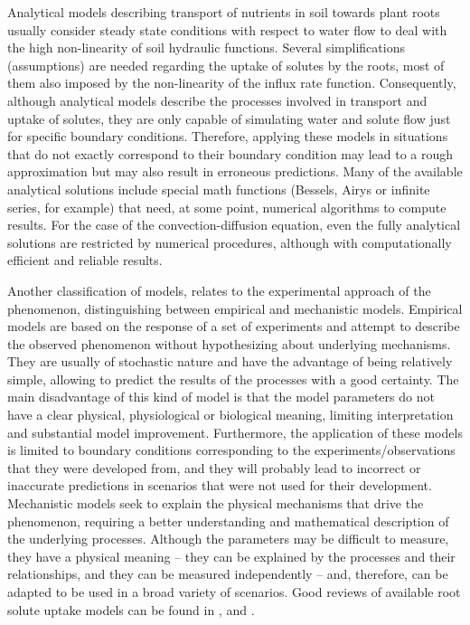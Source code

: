 Analytical models describing transport of nutrients in soil towards plant roots usually consider steady state conditions with respect to water flow to deal with the high non-linearity of soil hydraulic functions. 
Several simplifications (assumptions) are needed regarding the uptake of solutes by the roots, most of them also imposed by the non-linearity of the influx rate function. 
Consequently, although analytical models describe the processes involved in transport and uptake of solutes, they are only capable of simulating water and solute flow just for specific boundary conditions.
Therefore, applying these models in situations that do not exactly correspond to their boundary condition may lead to a rough approximation but may also result in erroneous predictions.
Many of the available analytical solutions include special math functions (Bessels, Airys or infinite series, for example) that need, at some point, numerical algorithms to compute results.
For the case of the convection-diffusion equation, even the fully analytical solutions are restricted by numerical procedures, although with computationally efficient and reliable results.

Another classification of models, relates to the experimental approach of the phenomenon, distinguishing between empirical and mechanistic models. 
Empirical models \citep{chanter,ross,yerokun} are based on the response of a set of experiments and attempt to describe the observed phenomenon without hypothesizing about underlying mechanisms. 
They are usually of stochastic nature and have the advantage of being relatively simple, allowing to predict the results of the processes with a good certainty. 
The main disadvantage of this kind of model is that the model parameters do not have a clear physical, physiological or biological meaning, limiting interpretation and substantial model improvement. 
Furthermore, the application of these models is limited to boundary conditions corresponding to the experiments/observations that they were developed from, and they will probably lead to incorrect or inaccurate predictions in scenarios that were not used for their development.
Mechanistic models \citep{barber74,cushman,willigen1,roose,simunekHYDRUS,somma,vandam} seek to explain the physical mechanisms that drive the phenomenon, requiring a better understanding and mathematical description of the underlying processes. 
Although the parameters may be difficult to measure, they have a physical meaning -- they can be explained by the processes and their relationships, and they can be measured independently -- and, therefore, can be adapted to be used in a broad variety of scenarios.
Good reviews of available root solute uptake models can be found in \cite{rengel}, \cite{feddes} and \cite{silberbush2013}.

